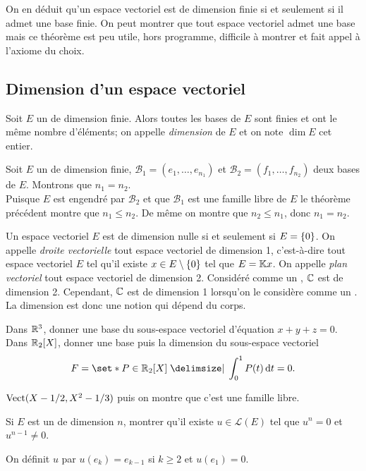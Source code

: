 \documentclass{magnolia}
\begin{document}
\begin{remarques}
\remarque[utile=-3] On en déduit qu'un espace vectoriel est de dimension finie si et seulement si il
  admet une base finie.
\remarque On peut montrer que tout espace vectoriel admet une base mais ce théorème est
  peu utile, hors programme, difficile à montrer et fait appel à l'axiome du choix.
\end{remarques}

\subsection{Dimension d'un espace vectoriel}


\begin{definition}[utile=-3]
Soit $E$ un \Kev de dimension finie. Alors toutes les bases de $E$ sont finies et ont le
même nombre d'éléments; on appelle \emph{dimension} de $E$ et on note $\dim E$ cet
entier.
\end{definition}
\begin{preuve}
Soit $E$ un \Kev de dimension finie, $\mathcal{B}_1=(e_1,\ldots,e_{n_1})$ et
$\mathcal{B}_2=(f_1,\ldots,f_{n_2})$ deux bases de $E$. Montrons que
$n_1=n_2$.\\
Puisque $E$ est engendré par $\mathcal{B}_2$ et que $\mathcal{B}_1$ est une
famille libre de $E$ le théorème précédent montre que $n_1\leq n_2$. De même on
montre que $n_2\leq n_1$, donc $n_1=n_2$.
\end{preuve}

\begin{remarques}
\remarque[utile=-2] Un espace vectoriel $E$ est de dimension nulle si et seulement
  si $E=\left\{0\right\}$. On appelle \emph{droite vectorielle} tout espace vectoriel de dimension 1,
  c'est-à-dire tout espace vectoriel $E$ tel qu'il existe $x\in E\setminus\left\{0\right\}$ tel
  que $E=\mathbb{K} x$. On appelle \emph{plan vectoriel} tout espace vectoriel de dimension 2.
\remarque[utile=-1] Considéré comme un \Rev, $\mathbb{C}$ est de dimension 2. Cependant, $\mathbb{C}$
  est de dimension 1 lorsqu'on le considère comme un \Cev. La dimension
  est donc une notion qui dépend du corps.
\end{remarques}

\begin{exos}
\exo Dans $\mathbb{R}^3$, donner une base du sous-espace vectoriel d'équation $x+y+z=0$.
\exo Dans $\polyR[2]$, donner une base puis la dimension du sous-espace vectoriel
  \[F=\enstq{P\in\polyR[2]}{\integ{0}{1}{P(t)}{t}=0}.\]
  
  \begin{sol}
  $\operatorname{Vect}(X-1/2,X^2-1/3)$ puis on montre que c'est une famille libre.
  \end{sol}
\exo Si $E$ est un \Kev de dimension $n$, montrer qu'il existe $u\in\mathcal{L}(E)$
  tel que $u^n=0$ et $u^{n-1}\neq 0$.
  \begin{sol}
  On définit $u$ par $u(e_k)=e_{k-1}$ si $k\geq 2$ et $u(e_1)=0$.
  \end{sol}
\end{exos}
\end{document}
